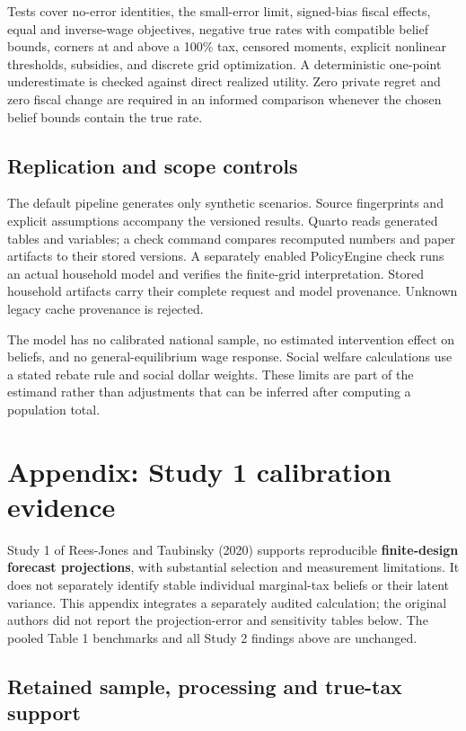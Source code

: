 \documentclass[
  11pt,
  letterpaper,
  DIV=11,
  numbers=noendperiod]{scrartcl}
\begin{document}
Tests cover no-error identities, the small-error limit, signed-bias
fiscal effects, equal and inverse-wage objectives, negative true rates
with compatible belief bounds, corners at and above a 100\% tax,
censored moments, explicit nonlinear thresholds, subsidies, and discrete
grid optimization. A deterministic one-point underestimate is checked
against direct realized utility. Zero private regret and zero fiscal
change are required in an informed comparison whenever the chosen belief
bounds contain the true rate.

\subsection{Replication and scope
controls}\label{replication-and-scope-controls}

The default pipeline generates only synthetic scenarios. Source
fingerprints and explicit assumptions accompany the versioned results.
Quarto reads generated tables and variables; a check command compares
recomputed numbers and paper artifacts to their stored versions. A
separately enabled PolicyEngine check runs an actual household model and
verifies the finite-grid interpretation. Stored household artifacts
carry their complete request and model provenance. Unknown legacy cache
provenance is rejected.

The model has no calibrated national sample, no estimated intervention
effect on beliefs, and no general-equilibrium wage response. Social
welfare calculations use a stated rebate rule and social dollar weights.
These limits are part of the estimand rather than adjustments that can
be inferred after computing a population total.

\section{Appendix: Study 1 calibration evidence}\label{sec-study1-audit}

Study 1 of Rees-Jones and Taubinsky (2020) supports reproducible
\textbf{finite-design forecast projections}, with substantial selection
and measurement limitations. It does not separately identify stable
individual marginal-tax beliefs or their latent variance. This appendix
integrates a separately audited calculation; the original authors did
not report the projection-error and sensitivity tables below. The pooled
Table 1 benchmarks and all Study 2 findings above are unchanged.

\subsection{Retained sample, processing and true-tax
support}\label{retained-sample-processing-and-true-tax-support}
\end{document}
